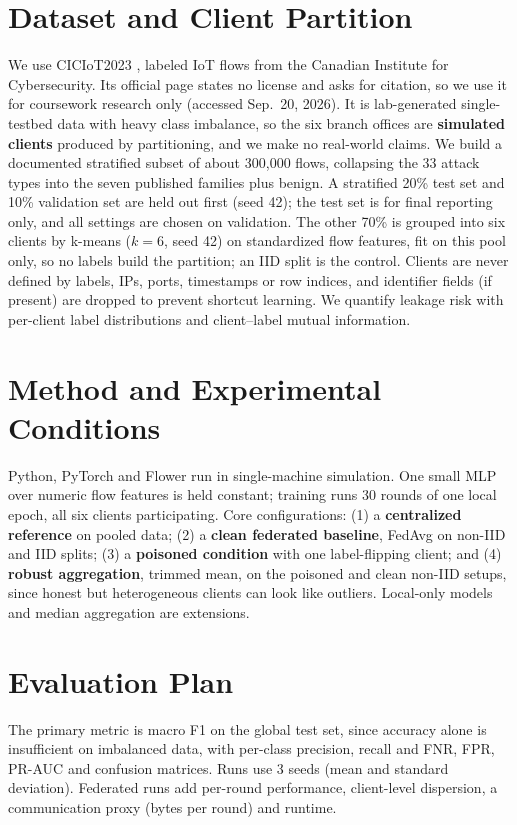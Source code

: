 \documentclass[conference]{IEEEtran}
\begin{document}
\section{Dataset and Client Partition}
We use CICIoT2023 \cite{neto2023}, labeled IoT flows from the Canadian Institute
for Cybersecurity. Its official page states no license and asks for citation, so
we use it for coursework research only (accessed Sep.~20, 2026). It is
lab-generated single-testbed data with heavy class imbalance, so the six branch
offices are \textbf{simulated clients} produced by partitioning, and we make no
real-world claims. We build a documented stratified subset of about 300{,}000
flows, collapsing the 33 attack types into the seven published families plus
benign. A stratified 20\% test set and 10\% validation set are held out first (seed 42); the
test set is for final reporting only, and all settings are chosen on validation.
The other 70\% is grouped into six clients by k-means ($k=6$, seed 42) on
standardized flow features, fit on this pool only, so no labels build the
partition; an IID split is the control. Clients are never defined by labels, IPs,
ports, timestamps or row indices, and identifier fields (if present) are dropped
to prevent shortcut learning. We quantify leakage risk with per-client label
distributions and client--label mutual information.

\section{Method and Experimental Conditions}
Python, PyTorch and Flower \cite{beutel2020} run in single-machine simulation. One
small MLP over numeric flow features is held constant; training runs 30 rounds
of one local epoch, all six clients participating. Core configurations: (1) a
\textbf{centralized reference} on pooled data; (2) a \textbf{clean federated
baseline}, FedAvg on non-IID and IID splits; (3) a \textbf{poisoned condition} with
one label-flipping client; and (4) \textbf{robust aggregation}, trimmed mean, on the
poisoned and clean non-IID setups, since honest but heterogeneous clients can look
like outliers. Local-only models and median aggregation are extensions.

\section{Evaluation Plan}
The primary metric is macro F1 on the global test set, since accuracy alone is
insufficient on imbalanced data, with per-class precision, recall and FNR, FPR,
PR-AUC and confusion matrices. Runs use 3 seeds (mean and standard deviation). Federated runs add per-round performance, client-level dispersion, a
communication proxy (bytes per round) and runtime.
\end{document}
